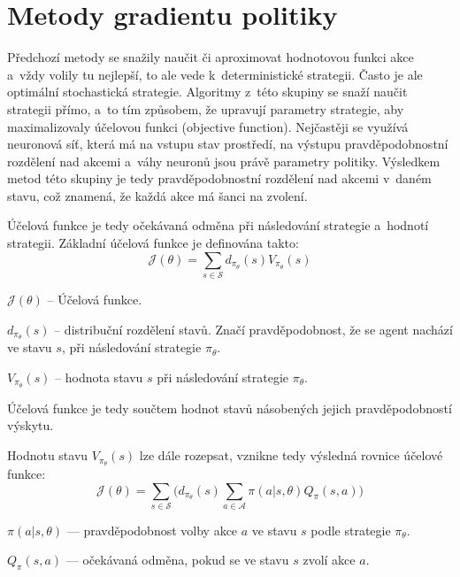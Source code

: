 \section{Metody gradientu politiky}\label{subsec:gradientni_metody}
Předchozí metody se snažily naučit či aproximovat hodnotovou funkci akce a~vždy volily tu nejlepší, to ale vede k~deterministické strategii.
Často je ale optimální stochastická strategie.
Algoritmy z~této skupiny se snaží naučit strategii přímo, a~to tím způsobem, že upravují parametry strategie, aby maximalizovaly účelovou funkci (objective function).
Nejčastěji se využívá neuronová síť, která má na vstupu stav prostředí, na výstupu pravděpodobnostní rozdělení nad akcemi a~váhy neuronů jsou právě parametry politiky.
Výsledkem metod této skupiny je tedy pravděpodobnostní rozdělení nad akcemi v~daném stavu, což znamená, že každá akce má šanci na zvolení.

Účelová funkce je tedy očekávaná odměna při následování strategie a~hodnotí strategii.
Základní účelová funkce je definována takto:
\begin{equation}
    \label{eq:ucelova_funkce_spojita}
  \mathcal{J}(\theta) = \sum_{s \in \mathcal{S}} d_{\pi_\theta}(s) V_{\pi_\theta}(s)
  \end{equation}

\begin{myitemize}
  \item $\mathcal{J}(\theta)$ -- Účelová funkce.
  \item $d_{\pi_\theta}(s)$ -- distribuční rozdělení stavů. Značí pravděpodobnost, že se agent nachází ve stavu $s$, při následování strategie $\pi_\theta$.
  \item $V_{\pi_\theta}(s)$ -- hodnota stavu $s$ při následování strategie $\pi_\theta$.\par
  \item Účelová funkce je tedy součtem hodnot stavů násobených jejich pravděpodobností výskytu.
\end{myitemize}

Hodnotu stavu $V_{\pi_\theta}(s)$ lze dále rozepsat, vznikne tedy výsledná rovnice účelové funkce:
\begin{equation}
  \mathcal{J}(\theta) = \sum_{s \in \mathcal{S}} \Big( d_{\pi_\theta}(s) \sum_{a \in \mathcal{A}} \pi(a \vert s, \theta) Q_\pi(s, a) \Big)
\end{equation}

\begin{myitemize}
  \item $\pi(a \vert s, \theta)$ --- pravděpodobnost volby akce $a$ ve stavu $s$ podle strategie $\pi_\theta$.
  \item $Q_\pi(s, a)$ --- očekávaná odměna, pokud se ve stavu $s$ zvolí akce $a$.
\end{myitemize}

